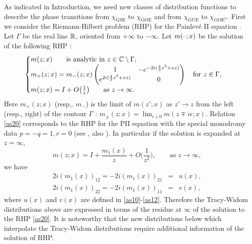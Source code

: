 \bigskip
As indicated in Introduction, we need new classes of distribution 
functions to describe the phase transitions from 
$\chi_{\text{GSE}}$ to $\chi_{\text{GOE}}$ 
and from $\chi_{\text{GUE}}$ to $\chi_{\text{GOE}^2}$.
First we consider the Riemann-Hilbert problem (RHP) for the Painlev\'e II 
equation \cite{FN, JMU}.
Let $\Gamma$ be the real line  $\mathbb R$, oriented from $+\infty$ to $-\infty$.
Let $m(\cdot\thinspace;x)$ be the solution of the following RHP :
\begin{equation}\label{as20}
 \begin{cases}
    m(z;x) \qquad \text{is analytic in $z\in\mathbb C\setminus\Gamma$,}\\
    m_+(z;x)=m_-(z;x) \begin{pmatrix} 1& -e^{-2i(\frac43z^3+xz)}\\
e^{2i(\frac43z^3+xz)}& 0 \end{pmatrix} \quad \text{for $z\in\Gamma$,}\\
    m(z;x) = I+O\bigl(\frac1{z}\bigr) \qquad \text{as $z\to\infty$.}
 \end{cases}
\end{equation}
Here $m_+(z;x)$ (resp,. $m_-$) is the limit of $m(z';x)$ as $z'\to z$
from the left (resp., right) of the contour $\Gamma$ :
$m_\pm(z;x)=\lim_{\epsilon\downarrow 0}m(z\mp i\epsilon;x)$.
Relation \eqref{as20} corresponds to 
the RHP for the PII equation with the special monodromy data
$p=-q=1, r=0$ (see \cite{FN, JMU}, also \cite{FZ,DZ2}).
In particular if the solution is expanded at $z=\infty$,
\begin{equation}\label{as7.27}
   m(z;x) = I+ \frac{m_1(x)}{z} + O\bigl(\frac1{z^2}\bigr),
\qquad \text{as $z\to\infty$},
\end{equation}
we have
\begin{eqnarray}
\label{as22}   2i(m_1(x))_{12} = -2i(m_1(x))_{21} &=& u(x), \\
\label{as23}   2i(m_1(x))_{22} = -2i(m_1(x))_{11}&=& v(x),
\end{eqnarray}
where $u(x)$ and $v(x)$ are defined in \eqref{as10}-\eqref{as12}.
Therefore the Tracy-Widom distributions above are expressed in terms of
the residue at $\infty$ of the solution to the RHP \eqref{as20}. 
It is noteworthy that the new distributions below which interpolate the 
Tracy-Widom distributions require additional information 
of the solution of RHP.

